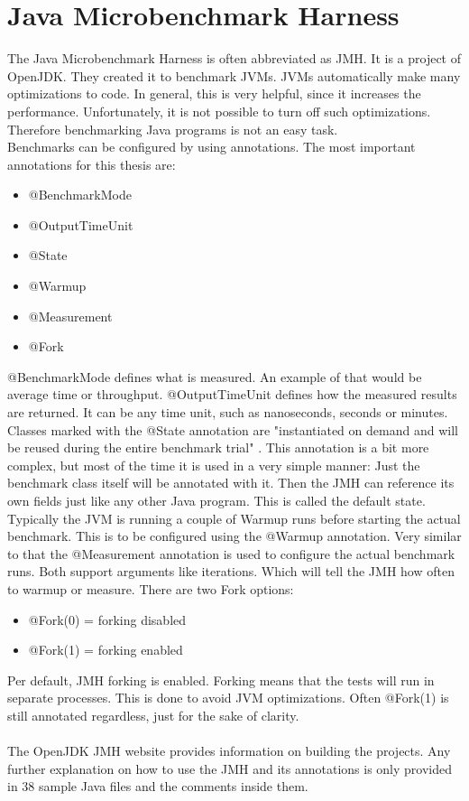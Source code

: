 \section{Java Microbenchmark Harness}
The Java Microbenchmark Harness is often abbreviated as JMH. It is a project of OpenJDK. They created it to benchmark JVMs. JVMs automatically make many optimizations to code. In general, this is very helpful, since it increases the performance. Unfortunately, it is not possible to turn off such optimizations. Therefore benchmarking Java programs is not an easy task.
\\
Benchmarks can be configured by using annotations. The most important annotations for this thesis are:
\begin{itemize}
  \item @BenchmarkMode
  \item @OutputTimeUnit
  \item @State
  \item @Warmup
  \item @Measurement
  \item @Fork
\end{itemize}
@BenchmarkMode defines what is measured. An example of that would be average time or throughput. @OutputTimeUnit defines how the measured results are returned. It can be any time unit, such as nanoseconds, seconds or minutes. Classes marked with the @State annotation are "instantiated on demand and will be reused during the entire benchmark trial" \cite{OpenJDK:jmh:3}. This annotation is a bit more complex, but most of the time it is used in a very simple manner: Just the benchmark class itself will be annotated with it. Then the JMH can reference its own fields just like any other Java program. This is called the default state. \cite{OpenJDK:jmh:4}
Typically the JVM is running a couple of Warmup runs before starting the actual benchmark. This is to be configured using the @Warmup annotation. Very similar to that the @Measurement annotation is used to configure the actual benchmark runs. Both support arguments like iterations. Which will tell the JMH how often to warmup or measure. There are two Fork options:
\begin{itemize}
  \item @Fork(0) = forking disabled
  \item @Fork(1) = forking enabled
\end{itemize}
Per default, JMH forking is enabled. Forking means that the tests will run in separate processes. This is done to avoid JVM optimizations. Often @Fork(1) is still annotated regardless, just for the sake of clarity. \cite{OpenJDK:jmh:12}
\\
\\
The OpenJDK JMH website provides information on building the projects. Any further explanation on how to use the JMH and its annotations is only provided in 38 sample Java files and the comments inside them. \cite{OpenJDK:jmh}

